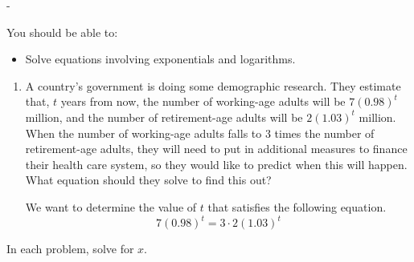 \documentclass{article}
\makeatletter
\newlength{\tipmargin}
\renewenvironment{framed}{
  \setlength{\tipmargin}{\textwidth-\linewidth}
  \advance\@totalleftmargin-\tipmargin
  \def\FrameCommand{\hspace{\tipmargin}\fbox}%
  \advance\linewidth\tipmargin
  \MakeFramed {\advance\hsize-\width \FrameRestore}%
}
{\endMakeFramed}
\makeatother
\begin{document}

\begin{problemonly}
  \begin{framed}

You should be able to:
    \begin{itemize}[topsep=0pt,partopsep=0pt,parsep=8pt,itemsep=0pt]
    \item Solve equations involving exponentials and logarithms.

    \end{itemize}
  \end{framed}
\end{problemonly}

\begin{enumerate}
\item  \label{exponentials-demographics}


  \begin{problem}[\vfill]
    A country's government is doing some demographic research. They estimate that, $t$ years from now, the number of working-age adults will be $7 (0.98)^t$ million, and the number of retirement-age adults will be $2(1.03)^t$ million. When the number of working-age adults falls to 3 times the number of retirement-age adults, they will need to put in additional measures to finance their health care system, so they would like to predict when this will happen. What equation should they solve to find this out?
  \end{problem}

  \begin{solution}
    We want to determine the value of $t$ that
    satisfies the following equation.
    \[7(0.98)^t = 3\cdot 2(1.03)^t\]
  \end{solution}

\end{enumerate}
In each problem, solve for $x$. 
\end{document}
